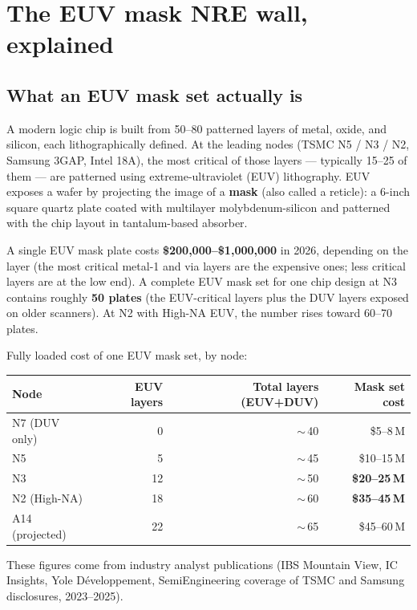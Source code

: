 \documentclass[11pt,letterpaper]{article}
\begin{document}
\section{The EUV mask NRE wall, explained}

\subsection{What an EUV mask set actually is}

A modern logic chip is built from 50--80 patterned layers of metal, oxide, and silicon, each lithographically defined. At the leading nodes (TSMC N5 / N3 / N2, Samsung 3GAP, Intel 18A), the most critical of those layers --- typically 15--25 of them --- are patterned using extreme-ultraviolet (EUV) lithography. EUV exposes a wafer by projecting the image of a \textbf{mask} (also called a reticle): a 6-inch square quartz plate coated with multilayer molybdenum-silicon and patterned with the chip layout in tantalum-based absorber.

A single EUV mask plate costs \textbf{\$200{,}000--\$1{,}000{,}000} in 2026, depending on the layer (the most critical metal-1 and via layers are the expensive ones; less critical layers are at the low end). A complete EUV mask set for one chip design at N3 contains roughly \textbf{50 plates} (the EUV-critical layers plus the DUV layers exposed on older scanners). At N2 with High-NA EUV, the number rises toward 60--70 plates.

Fully loaded cost of one EUV mask set, by node:

\begin{center}
\begin{tabular}{lrrr}
\toprule
Node & EUV layers & Total layers (EUV+DUV) & Mask set cost \\
\midrule
N7 (DUV only) & 0 & $\sim$\,40 & \$5--8\,M \\
N5 & 5 & $\sim$\,45 & \$10--15\,M \\
N3 & 12 & $\sim$\,50 & \textbf{\$20--25\,M} \\
N2 (High-NA) & 18 & $\sim$\,60 & \textbf{\$35--45\,M} \\
A14 (projected) & 22 & $\sim$\,65 & \$45--60\,M \\
\bottomrule
\end{tabular}
\end{center}

These figures come from industry analyst publications (IBS Mountain View, IC Insights, Yole D\'eveloppement, SemiEngineering coverage of TSMC and Samsung disclosures, 2023--2025).
\end{document}
